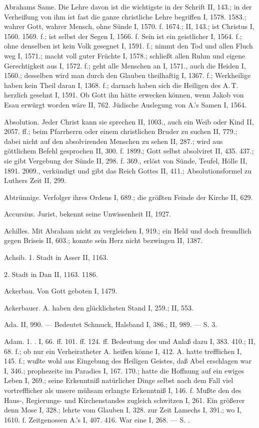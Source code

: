 Abrahams Same. Die Lehre davon ist die wichtigste in der Schrift II, 143.; in der Verheißung von ihm ist fast die ganze christliche Lehre begriffen I, 1578. 1583.; wahrer Gott, wahrer Mensch, ohne Sünde I, 1570. f. 1674.; II, 143.; ist Christus I, 1560. 1569. f.; ist selbst der Segen I, 1566. f. Sein  ist ein geistlicher I, 1564. f.; ohne denselben ist kein Volk gesegnet I, 1591. f.; nimmt den Tod und allen Fluch weg I, 1571.; macht voll guter Früchte I, 1578.; schließt allen Ruhm und eigene Gerechtigkeit aus I, 1572. f.; geht alle Menschen an I, 1571., auch die Heiden I, 1560.; desselben wird man durch den Glauben theilhaftig I, 1367. f.; Werkheilige haben kein Theil daran I, 1368. f.; darnach haben sich die Heiligen des A.\,T. herzlich gesehnt I, 1591. Ob Gott ihn hätte erwecken können, wenn Jakob von Esau erwürgt worden wäre II, 762. Jüdische Auslegung von A.’s Samen I, 1564.

Absolution. Jeder Christ kann sie sprechen II, 1003., auch ein Weib oder Kind II, 2057. ff.; beim Pfarrherrn oder einem christlichen Bruder zu suchen II, 779.; dabei nicht auf den absolvirenden Menschen zu sehen II, 287.; wird aus göttlichem Befehl gesprochen II, 300. f. 1899.; Gott selbst absolviret II, 435. 437.; sie gibt Vergebung der Sünde II, 298. f. 369., erlöst von Sünde, Teufel, Hölle II, 1891. 2009., verkündigt und gibt das Reich Gottes II, 411.; Absolutionsformel zu Luthers Zeit II, 299.

Abtrünnige. Verfolger ihres Ordens I, 689.; die größten Feinde der Kirche II, 629.

Accursius. Jurist, bekennt seine Unwissenheit II, 1927.

Achilles. Mit Abraham nicht zu vergleichen I, 919.; ein Held und doch freundlich gegen Briseis II, 603.; konnte sein Herz nicht bezwingen II, 1387.

Achsib. 1. Stadt in Asser II, 1163.

2. Stadt in Dan II, 1163. 1186.

Ackerbau. Von Gott geboten I, 1479.

Ackerbauer. A. haben den glücklichsten Stand I, 259.; II, 553.

Ada. II, 990. — Bedeutet Schmuck, Halsband I, 386.; II, 989. — S.  3.

Adam. 1. . I, 66. ff. 101. ff. 124. ff. Bedeutung des  und Anlaß dazu I, 383. 410.; II, 68. f.; ob nur ein Verheiratheter A. heißen könne I, 412. A. hatte trefflichen  I, 145. f.; wußte wohl aus Eingebung des Heiligen Geistes, daß Abel erschlagen war I, 346.; prophezeite im Paradies I, 167. 170.; hatte die Hoffnung auf ein ewiges Leben I, 269.; seine Erkenntniß natürlicher Dinge selbst nach dem Fall viel vortrefflicher als unsere mühsam erlangte Erkenntniß I, 146. f. Mußte den  des Haus-, Regierungs- und Kirchenstandes zugleich schwitzen I, 261. Ein größerer  denn Mose I, 328.; lehrte vom Glauben I, 328.  zur Zeit Lamechs I, 391.; wo  I, 1610. f. Zeitgenossen A.’s I, 407. 416. War eine  I, 268. — S. .

